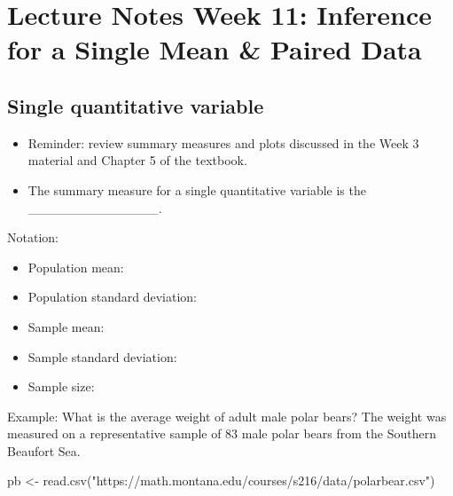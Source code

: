 \documentclass[
]{report}
\newenvironment{Shaded}{\begin{snugshade}}{\end{snugshade}}
\newcommand{\FunctionTok}[1]{\textcolor[rgb]{0.00,0.00,0.00}{#1}}
\newcommand{\NormalTok}[1]{#1}
\newcommand{\OtherTok}[1]{\textcolor[rgb]{0.56,0.35,0.01}{#1}}
\newcommand{\StringTok}[1]{\textcolor[rgb]{0.31,0.60,0.02}{#1}}
\begin{document}
\newpage

\hypertarget{lecture-notes-week-11-inference-for-a-single-mean-paired-data}{%
\section{Lecture Notes Week 11: Inference for a Single Mean \& Paired Data}\label{lecture-notes-week-11-inference-for-a-single-mean-paired-data}}


\hypertarget{single-quantitative-variable}{%
\subsection{Single quantitative variable}\label{single-quantitative-variable}}

\begin{itemize}
\item
  Reminder: review summary measures and plots discussed in the Week 3 material and Chapter 5 of the textbook.
\item
  The summary measure for a single quantitative variable is the \_\_\_\_\_\_\_\_\_\_\_\_\_\_.
\end{itemize}


Notation:

\begin{itemize}
\item
  Population mean:
\item
  Population standard deviation:
\item
  Sample mean:
\item
  Sample standard deviation:
\item
  Sample size:
\end{itemize}


Example: What is the average weight of adult male polar bears? The weight was measured on a representative sample of 83 male polar bears from the Southern Beaufort Sea.

\begin{Shaded}
\begin{Highlighting}[]
\NormalTok{pb }\OtherTok{\textless{}{-}} \FunctionTok{read.csv}\NormalTok{(}\StringTok{"https://math.montana.edu/courses/s216/data/polarbear.csv"}\NormalTok{)}
\end{Highlighting}
\end{Shaded}
\end{document}
